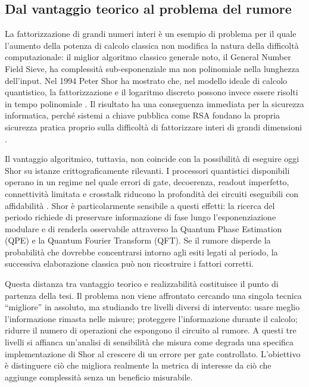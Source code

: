 \begin{onehalfspace}

\section{Dal vantaggio teorico al problema del
rumore}

La fattorizzazione di grandi numeri interi è un esempio di problema per il quale
l'aumento della potenza di calcolo classica non modifica la natura della difficoltà
computazionale: il miglior algoritmo classico generale noto, il General Number Field
Sieve, ha complessità sub-esponenziale ma non polinomiale nella lunghezza dell'input.
Nel 1994 Peter Shor ha mostrato che, nel modello ideale di calcolo quantistico, la
fattorizzazione e il logaritmo discreto possono invece essere risolti in tempo
polinomiale \cite{shor1994}. Il risultato ha una conseguenza immediata per la sicurezza
informatica, perché sistemi a chiave pubblica come RSA fondano la propria sicurezza
pratica proprio sulla difficoltà di fattorizzare interi di grandi dimensioni \cite{rsa1978}.

Il vantaggio algoritmico, tuttavia, non coincide con la possibilità di eseguire oggi
Shor su istanze crittograficamente rilevanti. I processori quantistici disponibili
operano in un regime nel quale errori di gate, decoerenza, readout imperfetto,
connettività limitata e crosstalk riducono la profondità dei circuiti eseguibili con
affidabilità \cite{preskill2018}. Shor è particolarmente sensibile a questi effetti: la ricerca del
periodo richiede di preservare informazione di fase lungo l'esponenziazione modulare e
di renderla osservabile attraverso la Quantum Phase Estimation (QPE) e la Quantum
Fourier Transform (QFT). Se il rumore disperde la probabilità che dovrebbe concentrarsi
intorno agli esiti legati al periodo, la successiva elaborazione classica può non
ricostruire i fattori corretti.

Questa distanza tra vantaggio teorico e realizzabilità costituisce il punto di partenza
della tesi. Il problema non viene affrontato cercando una singola tecnica ``migliore''
in assoluto, ma studiando tre livelli diversi di intervento: usare meglio l'informazione
rimasta nelle misure; proteggere l'informazione durante il calcolo; ridurre il numero di
operazioni che espongono il circuito al rumore. A questi tre livelli si affianca
un'analisi di sensibilità che misura come degrada una specifica implementazione di Shor
al crescere di un errore per gate controllato. L'obiettivo è distinguere ciò che
migliora realmente la metrica di interesse da ciò che aggiunge complessità senza un
beneficio misurabile.


\end{onehalfspace}
